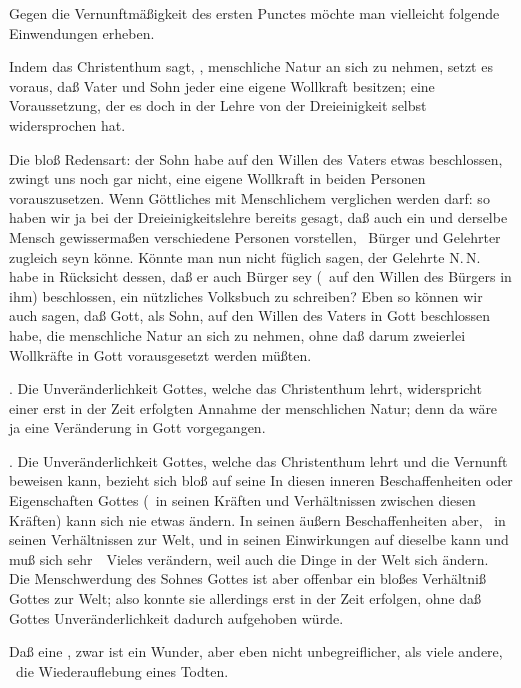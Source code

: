 \begin{aufza}
\item Gegen die Vernunftmäßigkeit des ersten Punctes möchte man vielleicht folgende Einwendungen erheben.\par
{} Indem das Christenthum sagt, , menschliche Natur an sich zu nehmen, setzt es voraus, daß Vater und Sohn jeder eine eigene Wollkraft besitzen; eine Voraussetzung, der es doch in der Lehre von der Dreieinigkeit selbst widersprochen hat.\par
{} Die bloß  Redensart: der Sohn habe auf den Willen des Vaters etwas beschlossen, zwingt uns noch gar nicht, eine eigene Wollkraft in beiden Personen vorauszusetzen. Wenn Göttliches mit Menschlichem verglichen werden darf: so haben wir ja bei der Dreieinigkeitslehre bereits gesagt, daß auch ein und derselbe Mensch gewissermaßen verschiedene Personen vorstellen, \zB\ Bürger und Gelehrter zugleich seyn könne. Könnte man nun nicht füglich sagen, der Gelehrte N.\,N. habe in Rücksicht dessen, daß er auch Bürger sey (\dh\ auf den Willen des Bürgers in ihm) beschlossen, ein nützliches Volksbuch zu schreiben? Eben so können wir auch sagen, daß Gott, als Sohn, auf den Willen des Vaters in Gott beschlossen habe, die menschliche Natur an sich zu nehmen, ohne daß darum zweierlei Wollkräfte in Gott vorausgesetzt werden müßten.\par
{}. Die Unveränderlichkeit Gottes, welche das Christenthum lehrt, widerspricht einer erst in der Zeit erfolgten Annahme der menschlichen Natur; denn da wäre ja eine Veränderung in Gott vorgegangen.\par
{}. Die Unveränderlichkeit Gottes, welche das Christenthum lehrt und die Vernunft beweisen kann, bezieht sich bloß auf seine  In diesen inneren Beschaffenheiten oder Eigenschaften Gottes (\dh\ in seinen Kräften und Verhältnissen zwischen diesen Kräften) kann sich nie etwas ändern. In seinen äußern Beschaffenheiten aber, \dh\ in seinen Verhältnissen zur Welt, und in seinen Einwirkungen auf dieselbe kann und muß sich sehr~\ Vieles verändern, weil auch die Dinge in der Welt sich ändern. Die Menschwerdung des Sohnes Gottes ist aber offenbar ein bloßes Verhältniß Gottes zur Welt; also konnte sie allerdings erst in der Zeit erfolgen, ohne daß Gottes Unveränderlichkeit dadurch aufgehoben würde.
\item Daß eine , zwar ist ein Wunder, aber eben nicht unbegreiflicher, als viele andere, \zB\ die Wiederauflebung eines Todten.

\end{aufza}
